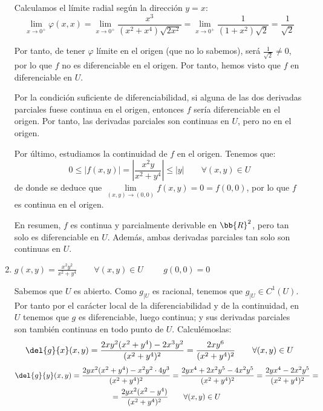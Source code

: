\begin{ejercicio}
\begin{enumerate}
        Calculamos el límite radial según la dirección $y=x$:
        \begin{equation*}
            \lim_{x\to 0^+}\varphi(x,x) = \lim_{x\to 0^+} \frac{x^3}{(x^2+x^4)\sqrt{2x^2}}
             = \lim_{x\to 0^+} \frac{1}{(1+x^2)\sqrt{2}} = \frac{1}{\sqrt{2}}
        \end{equation*}

        Por tanto, de tener $\varphi$ límite en el origen (que no lo sabemos), será $\frac{1}{\sqrt{2}}\neq 0$, por lo que $f$ no es diferenciable en el origen. Por tanto, hemos visto que $f$ en diferenciable en $U$.

        Por la condición suficiente de diferenciabilidad, si alguna de las dos derivadas parciales fuese continua en el origen, entonces $f$ sería diferenciable en el origen. Por tanto, las derivadas parciales son continuas en $U$, pero no en el origen.

        Por último, estudiamos la continuidad de $f$ en el origen. Tenemos que:
        \begin{equation*}
            0\leq |f(x,y)| = \left|\frac{x^2y}{x^2+y^4}\right|\leq |y| \qquad \forall (x,y)\in U
        \end{equation*}
        de donde se deduce que $\lim\limits_{(x,y)\to (0,0)} f(x,y) = 0 = f(0,0)$, por lo que $f$ es continua en el origen.

        En resumen, $f$ es continua y parcialmente derivable en $\bb{R}^2$, pero tan solo es diferenciable en $U$. Además, ambas derivadas parciales tan solo son continuas en $U$.
        
        \item $\displaystyle
            g(x,y)=\frac{x^2y^2}{x^2 + y^4} \qquad \forall (x,y)\in U
            \hspace{1cm}
            g(0,0)=0$
    
        Sabemos que $U$ es abierto. Como $g_{\big| U}$ es racional, tenemos que $g_{\big|U}\in C^1(U)$. Por tanto por el carácter local de la diferenciabilidad y de la continuidad, en $U$ tenemos que $g$ es diferenciable, luego continua; y sus derivadas parciales son también continuas en todo punto de $U$. Calculémoslas:
        \begin{equation*}
            \del{g}{x} (x,y) = \frac{2xy^2(x^2+y^4) - 2x^3y^2}{(x^2+y^4)^2}
            = \frac{2xy^6}{(x^2+y^4)^2} \qquad \forall (x,y)\in U
        \end{equation*}
        \begin{multline*}
            \del{g}{y} (x,y) = \frac{2yx^2(x^2+y^4) - x^2y^2\cdot 4y^3}{(x^2+y^4)^2}
            = \frac{2yx^4 + 2x^2y^5 -4x^2y^5}{(x^2+y^4)^2} 
            = \frac{2yx^4 -2x^2y^5}{(x^2+y^4)^2}=\\
            = \frac{2yx^2(x^2-y^4)}{(x^2+y^4)^2} \qquad \forall (x,y)\in U
        \end{multline*}
    

\end{enumerate}
\end{ejercicio}
